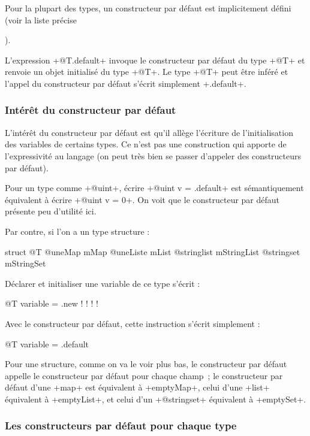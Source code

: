 Pour la plupart des types, un constructeur par défaut est implicitement défini (voir la liste précise {).


L'expression \ggst+@T.default+ invoque le constructeur par défaut du type \ggst+@T+ et renvoie un objet initialisé du type \ggst+@T+. Le type \ggst+@T+ peut être inféré et l'appel du constructeur par défaut s'écrit simplement \ggst+.default+.

\subsubsection{Intérêt du constructeur par défaut}


L'intérêt du constructeur par défaut est qu'il allège l'écriture de l'initialisation des variables de certains types. Ce n'est pas une construction qui apporte de l'expressivité au langage (on peut très bien se passer d'appeler des constructeurs par défaut).

Pour un type comme \ggst+@uint+, écrire \ggst+@uint v = .default+ est sémantiquement équivalent à écrire \ggst+@uint v = 0+. On voit que le constructeur par défaut présente peu d'utilité ici.

Par contre, si l'on a un type structure :

\begin{galgas3}
struct @T {
  @uneMap mMap
  @uneListe mList
  @stringlist mStringList
  @stringset mStringSet
}
\end{galgas3}

Déclarer et initialiser une variable de ce type s'écrit :

\begin{galgas3}
@T variable = .new {
  !{}
  !{}
  !{}
  !{}
}
\end{galgas3}

Avec le constructeur par défaut, cette instruction s'écrit simplement :

\begin{galgas3}
@T variable = .default
\end{galgas3}

Pour une structure, comme on va le voir plus bas, le constructeur par défaut appelle le constructeur par défaut pour chaque champ~; le constructeur par défaut d'une \ggst+map+ est équivalent à \ggst+emptyMap+, celui d'une \ggst+list+ équivalent à \ggst+emptyList+, et celui d'un \ggst+@stringset+ équivalent à \ggst+emptySet+.


\subsubsection{Les constructeurs par défaut pour chaque type}

}

